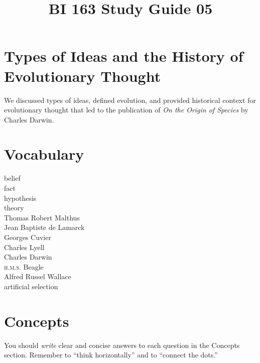 \documentclass[letterpaper]{tufte-handout}
\title{BI 163 Study Guide 05}
\date{} %
\begin{document}
\maketitle	%

\section*{Types of Ideas and the History of Evolutionary Thought}

We discussed types of ideas, defined evolution, and provided historical context for evolutionary thought that led to the publication of \textit{On the Origin of Species} by Charles Darwin.

\section*{Vocabulary}

\vspace{-1\baselineskip}
\begin{multicols}{2}
belief\\
fact\\
hypothesis\\
theory\\
Thomas Robert Malthus\\
Jean Baptiste de Lamarck \\
Georges Cuvier \\
Charles Lyell \\
Charles Darwin \\
\textsc{h.m.s.} Beagle \\
Alfred Russel Wallace \\
artificial selection 
\end{multicols}

\section*{Concepts}

You should \emph{write} clear and concise answers to each question in the Concepts section.  Remember to ``think horizontally'' and to ``connect the dots.'' 
\end{document}
